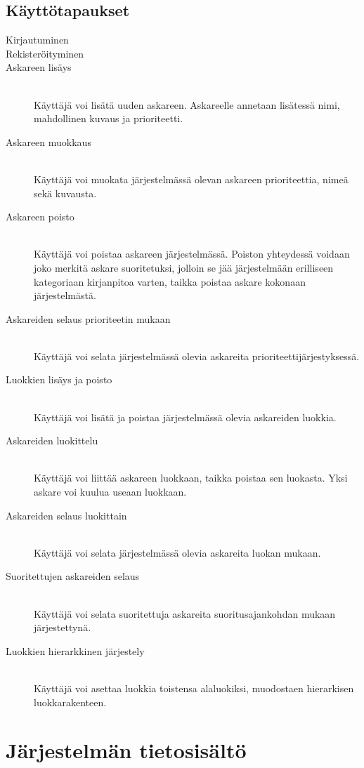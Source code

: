 ﻿\documentclass[finnish]{article}
\begin{document}
\subsection{Käyttötapaukset}
\begin{description}
  \item[Kirjautuminen]
  \item[Rekisteröityminen]
  \item[Askareen lisäys] \hfill \\
    Käyttäjä voi lisätä uuden askareen. Askareelle annetaan lisätessä nimi, mahdollinen kuvaus ja prioriteetti.
  \item[Askareen muokkaus] \hfill \\
    Käyttäjä voi muokata järjestelmässä olevan askareen prioriteettia, nimeä sekä kuvausta.
  \item[Askareen poisto] \hfill \\
    Käyttäjä voi poistaa askareen järjestelmässä. Poiston yhteydessä voidaan joko merkitä askare suoritetuksi, jolloin se jää järjestelmään erilliseen kategoriaan kirjanpitoa varten, taikka poistaa askare kokonaan järjestelmästä.
  \item[Askareiden selaus prioriteetin mukaan] \hfill \\
    Käyttäjä voi selata järjestelmässä olevia askareita prioriteettijärjestyksessä.
  \item[Luokkien lisäys ja poisto] \hfill \\
    Käyttäjä voi lisätä ja poistaa järjestelmässä olevia askareiden luokkia.
  \item[Askareiden luokittelu] \hfill \\
    Käyttäjä voi liittää askareen luokkaan, taikka poistaa sen luokasta. Yksi askare voi kuulua useaan luokkaan.
  \item[Askareiden selaus luokittain] \hfill \\
    Käyttäjä voi selata järjestelmässä olevia askareita luokan mukaan.
  \item[Suoritettujen askareiden selaus] \hfill \\
    Käyttäjä voi selata suoritettuja askareita suoritusajankohdan mukaan järjestettynä.
  \item[Luokkien hierarkkinen järjestely] \hfill \\
    Käyttäjä voi asettaa luokkia toistensa alaluokiksi, muodostaen hierarkisen luokkarakenteen.
\end{description}


\section{Järjestelmän tietosisältö}
\end{document}
